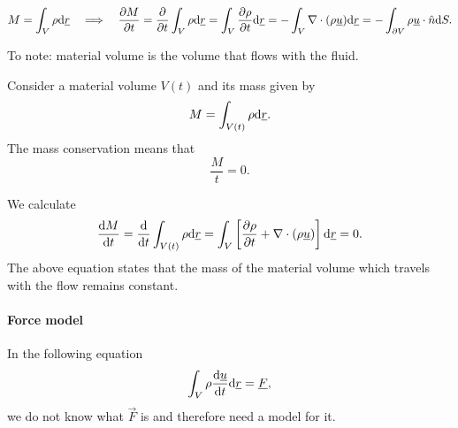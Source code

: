 \documentclass[../main.tex]{subfiles}
\begin{document}
    
    \begin{displaymath}
      M = \int_V \rho \mathrm{d} \underline{r} \quad \Longrightarrow \quad \frac{\partial M}{\partial t} 
      = \frac{\partial }{\partial t} \int_V \rho \mathrm{d} \underline{r} 
      = \int_V \frac{\partial \rho}{\partial t} \mathrm{d} \underline{r} 
      = - \int_V \nabla \cdot (\rho \underline{u}) \mathrm{d} \underline{r}
      = - \int_{\partial V} \rho \underline{u} \cdot \hat n \mathrm{d} S .
    \end{displaymath}

    To note: material volume is the volume that flows with the fluid.
    

    Consider a material volume $V(t)$ and its mass given by
    \begin{displaymath}
      M = \int_{V(t)}  \rho \mathrm{d} \underline{r}.
    \end{displaymath}
    The mass conservation means that
    \begin{displaymath}
      \dfrac{M}{t} = 0.
    \end{displaymath}

    We calculate
    \begin{displaymath}
      \frac{\mathrm{d} M}{\mathrm{d} t} = \frac{\mathrm{d} }{\mathrm{d} t} \int_{V(t)} \rho \mathrm{d} \underline{r} 
      = \int_V \left[ \frac{\partial \rho}{\partial t} + \nabla \cdot (\rho \underline{u}) \right]\mathrm{d} \underline{r} 
      = 0.
    \end{displaymath}
    The above equation states that the mass of the material volume which travels with the flow remains constant.
    
    \paragraph{Force model}
    In the following equation
    \begin{displaymath}
      \int_V \rho \frac{\mathrm{d} \underline{u}}{\mathrm{d} t} \mathrm{d} \underline{r} = \underline{F},
    \end{displaymath}
    we do not know what $\vec F$ is and therefore need a model for it.

    \begin{figure}[h]
      \centering
    \end{figure}
\end{document}
